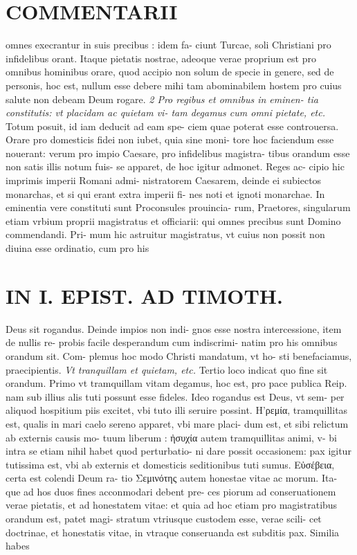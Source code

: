 \documentclass{article}
\begin{document}
\begin{pages}
\section*{COMMENTARII }
\marginpar{[ p.46 ]}\pstart omnes execrantur in suis precibus : idem fa- ciunt Turcae, soli Christiani pro infidelibus orant. Itaque pietatis nostrae, adeoque verae proprium est pro omnibus hominibus orare, quod accipio non solum de specie in genere, sed de personis, hoc est, nullum esse debere mihi tam abominabilem hostem pro cuius salute non debeam Deum rogare.  \pend
\textit{2 Pro regibus et omnibus in eminen- tia constitutis: vt placidam ac quietam vi- tam degamus cum omni pietate, etc. }\pstart Totum posuit, id iam deducit ad eam spe- ciem quae poterat esse controuersa. Orare pro domesticis fidei non iubet, quia sine moni- tore hoc faciendum esse nouerant: verum pro impio Caesare, pro infidelibus magistra- tibus orandum esse non satis illis notum fuis- se apparet, de hoc igitur admonet. Reges ac- cipio hic imprimis imperii Romani admi- nistratorem Caesarem, deinde ei subiectos monarchas, et si qui erant extra imperii fi- nes noti et ignoti monarchae. In eminentia vere constituti sunt Proconsules prouincia- rum, Praetores, singularum etiam vrbium proprii magistratus et officiarii: qui omnes precibus sunt Domino commendandi. Pri- mum hic astruitur magistratus, vt cuius non possit non diuina esse ordinatio, cum pro his  \pend
\section*{IN I. EPIST. AD TIMOTH. }
\marginpar{[ p.47 ]}\pstart Deus sit rogandus. Deinde impios non indi- gnos esse nostra intercessione, item de nullis re- probis facile desperandum cum indiscrimi- natim pro his omnibus orandum sit. Com- plemus hoc modo Christi mandatum, vt ho- sti benefaciamus, praecipientis.  \pend
\textit{Vt tranquillam et quietam, etc. }\pstart Tertio loco indicat quo fine sit orandum. Primo vt tramquillam vitam degamus, hoc est, pro pace publica Reip. nam sub illius alis tuti possunt esse fideles. Ideo rogandus est Deus, vt sem- per aliquod hospitium piis excitet, vbi tuto illi seruire possint. H'ρεμία, tramquillitas est, qualis in mari caelo sereno apparet, vbi mare placi- dum est, et sibi relictum ab externis causis mo- tuum liberum : ἠσυχία autem tramquillitas animi, v- bi intra se etiam nihil habet quod perturbatio- ni dare possit occasionem: pax igitur tutissima est, vbi ab externis et domesticis seditionibus tuti sumus. Εὐσέβεια, certa est colendi Deum ra- tio Σεμινότης autem honestae vitae ac morum. Ita- que ad hos duos fines acconmodari debent pre- ces piorum ad conseruationem verae pietatis, et ad honestatem vitae: et quia ad hoc etiam pro magistratibus orandum est, patet magi- stratum vtriusque custodem esse, verae scili- cet doctrinae, et honestatis vitae, in vtraque conseruanda est subditis pax. Similia habes  \pend

\end{pages}
\end{document}
